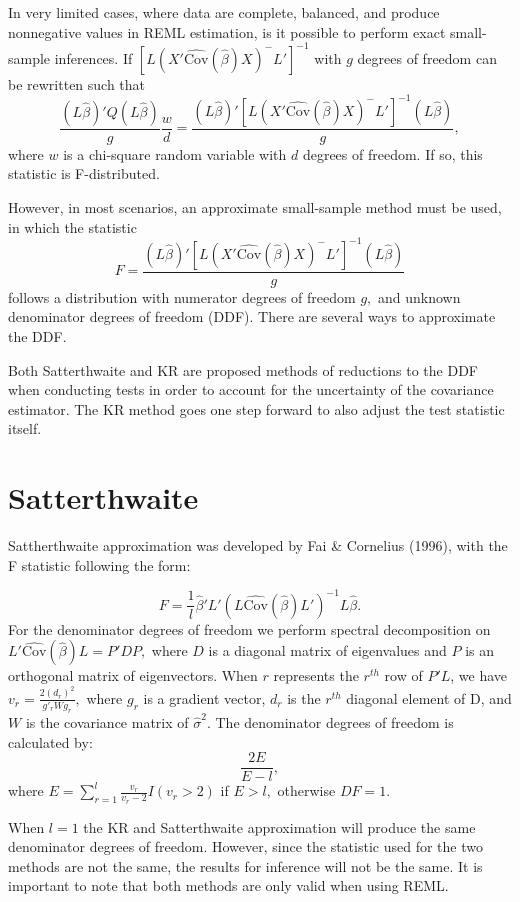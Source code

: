 \documentclass[12pt, twoside]{amherstthesis}
\begin{document}
In very limited cases, where data are complete, balanced, and produce nonnegative values in REML estimation, is it possible to perform exact small-sample inferences. If \([L(X'\widehat {\text{Cov}}(\hat\beta)X)^-L']^{-1}\) with \(g\) degrees of freedom can be rewritten such that \[ \frac{(L\hat\beta)'Q(L\hat\beta)}{g}\frac{w}{d} =  \frac{(L\hat\beta)'[L(X'\widehat {\text{Cov}}(\hat\beta)X)^-L']^{-1}(L\hat\beta)}{g},\] where \(w\) is a chi-square random variable with \(d\) degrees of freedom. If so, this statistic is F-distributed.

However, in most scenarios, an approximate small-sample method must be used, in which the statistic \[F = \frac{(L\hat\beta)'[L(X'\widehat {\text{Cov}}(\hat\beta)X)^-L']^{-1}(L\hat\beta)}{g}\] follows a distribution with numerator degrees of freedom \(g,\) and unknown denominator degrees of freedom (DDF). There are several ways to approximate the DDF.

Both Satterthwaite and KR are proposed methods of reductions to the DDF when conducting tests in order to account for the uncertainty of the covariance estimator. The KR method goes one step forward to also adjust the test statistic itself.

\hypertarget{satterthwaite}{%
\section{Satterthwaite}\label{satterthwaite}}

Sattherthwaite approximation was developed by Fai \& Cornelius (1996), with the F statistic following the form:

\[F = \frac{1}{l}\hat\beta'L'(L\widehat {\text{Cov}}(\hat\beta) L')^{-1}L\hat\beta.\] For the denominator degrees of freedom we perform spectral decomposition on \(L'\widehat {\text{Cov}}(\hat\beta) L=P'DP,\) where \(D\) is a diagonal matrix of eigenvalues and \(P\) is an orthogonal matrix of eigenvectors. When \(r\) represents the \(r^{th}\) row of \(P'L\), we have \(v_r = \frac{2(d_r)^2}{g'_rWg_r},\) where \(g_r\) is a gradient vector, \(d_r\) is the \(r^{th}\) diagonal element of D, and \(W\) is the covariance matrix of \(\hat\sigma^2.\) The denominator degrees of freedom is calculated by:
\[\frac{2E}{E-l},\] where \(E = \sum_{r = 1}^{l} \frac{v_r}{v_r-2}I(v_r>2)\) if \(E >l,\) otherwise \(DF = 1.\)

When \(l =1\) the KR and Satterthwaite approximation will produce the same denominator degrees of freedom. However, since the statistic used for the two methods are not the same, the results for inference will not be the same. It is important to note that both methods are only valid when using REML.
\end{document}
